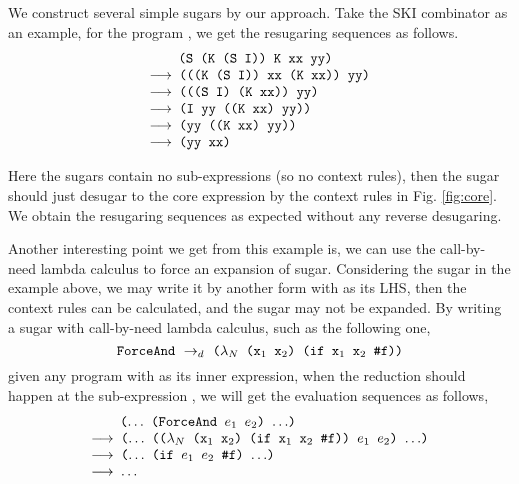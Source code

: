 We construct several simple sugars by our approach. Take the SKI combinator as an example, for the program , we get the resugaring sequences as follows.
\[
	\begin{array}{l}
		\quad\;\;\Code{ (S (K (S I)) K xx yy)}\\
	\OneStep{ \Code{ (((K (S I)) xx (K xx)) yy)}}\\
	\OneStep{ \Code{ (((S I) (K xx)) yy)}}\\
	\OneStep{ \Code{ (I yy ((K xx) yy))}}\\
	\OneStep{ \Code{ (yy ((K xx) yy))}}\\
	\OneStep{ \Code{ (yy xx)}}\\
	\end{array}
\]




Here the sugars contain no sub-expressions (so no context rules), then the sugar should just desugar to the core expression by the context rules in Fig. \ref{fig:core}. 
We obtain the resugaring sequences as expected without any reverse desugaring.

Another interesting point we get from this example is, we can use the call-by-need lambda calculus to force an expansion of sugar. Considering the sugar  in the example above, we may write it by another form with  as its LHS, then the context rules can be calculated, and the sugar may not be expanded. By writing a sugar with call-by-need lambda calculus, such as the following one,
\[
\texttt{ForceAnd} ~\rightarrow_d~ \texttt{($\lambda_N$ ($\mbox{\tt x}_1$ $\mbox{\tt x}_2$) (if $\mbox{\tt x}_1$ $\mbox{\tt x}_2$ \#f))}
\]
given any program with  as its inner expression, when the reduction should happen at the sub-expression , we will get the evaluation sequences as follows,
\[
	\begin{array}{l}
		\quad\;\;\Code{ ($\ldots$ (ForceAnd $e_1$ $e_2$) $\ldots$)}\\
	\OneStep{ \Code{ ($\ldots$ (($\lambda_N$ ($\m{x}_1$ $\m{x}_2$) (if $\m{x}_1$ $\m{x}_2$ \false)) $e_1$ $e_2$) $\ldots$)}}\\
	\OneStep{ \Code{ ($\ldots$ (if $e_1$ $e_2$ \false) $\ldots$)}}\\
	\OneStep{ \Code{ $\ldots$}}\\
	\end{array}
\]
